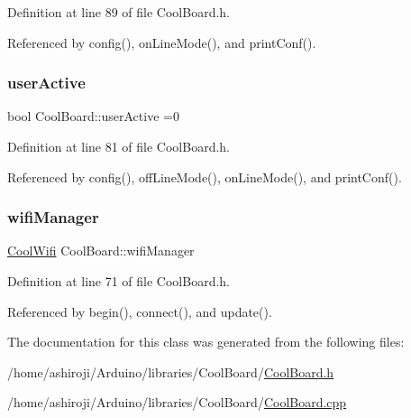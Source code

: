 Definition at line 89 of file Cool\+Board.\+h.



Referenced by config(), on\+Line\+Mode(), and print\+Conf().

\mbox{\label{classCoolBoard_a6395459131d6889a3005f79c7a35e964}} 
\subsubsection{\texorpdfstring{user\+Active}{userActive}}
{\footnotesize\ttfamily bool Cool\+Board\+::user\+Active =0\hspace{0.3cm}{\ttfamily [private]}}



Definition at line 81 of file Cool\+Board.\+h.



Referenced by config(), off\+Line\+Mode(), on\+Line\+Mode(), and print\+Conf().

\mbox{\label{classCoolBoard_acd88e6003606b47479ebba81e4aceeca}} 
\subsubsection{\texorpdfstring{wifi\+Manager}{wifiManager}}
{\footnotesize\ttfamily \hyperlink{classCoolWifi}{Cool\+Wifi} Cool\+Board\+::wifi\+Manager\hspace{0.3cm}{\ttfamily [private]}}



Definition at line 71 of file Cool\+Board.\+h.



Referenced by begin(), connect(), and update().



The documentation for this class was generated from the following files\+:\begin{DoxyCompactItemize}
\item 
/home/ashiroji/\+Arduino/libraries/\+Cool\+Board/\hyperlink{CoolBoard_8h}{Cool\+Board.\+h}\item 
/home/ashiroji/\+Arduino/libraries/\+Cool\+Board/\hyperlink{CoolBoard_8cpp}{Cool\+Board.\+cpp}\end{DoxyCompactItemize}
